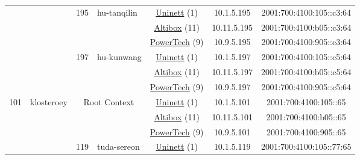 \begin{small}
\begin{center}
\begin{longtable}{|c|c|c|c|c|c|c|c|}
  &  & \multirow{3}{*}{\tiny{195}} & \multicolumn{1}{|l|}{\multirow{3}{*}{\tiny{hu-tanqilin}}} & \multicolumn{2}{|c|}{\tiny{\href{https://www.uninett.no}{Uninett} (1)}} & \tiny{10.1.5.195} & \tiny{2001:700:4100:105::c3:64} \\* \cline{5-5}\cline{6-6}\cline{7-7}\cline{8-8}
  &  &  &  & \multicolumn{2}{|c|}{\tiny{\href{https://www.altibox.no}{Altibox} (11)}} & \tiny{10.11.5.195} & \tiny{2001:700:4100:b05::c3:64} \\* \cline{5-5}\cline{6-6}\cline{7-7}\cline{8-8}
  &  &  &  & \multicolumn{2}{|c|}{\tiny{\href{http://www.powertech.no}{PowerTech} (9)}} & \tiny{10.9.5.195} & \tiny{2001:700:4100:905::c3:64} \\* \cline{3-3}\cline{4-4}\cline{5-5}\cline{6-6}\cline{7-7}\cline{8-8}
  &  & \multirow{3}{*}{\tiny{197}} & \multicolumn{1}{|l|}{\multirow{3}{*}{\tiny{hu-kunwang}}} & \multicolumn{2}{|c|}{\tiny{\href{https://www.uninett.no}{Uninett} (1)}} & \tiny{10.1.5.197} & \tiny{2001:700:4100:105::c5:64} \\* \cline{5-5}\cline{6-6}\cline{7-7}\cline{8-8}
  &  &  &  & \multicolumn{2}{|c|}{\tiny{\href{https://www.altibox.no}{Altibox} (11)}} & \tiny{10.11.5.197} & \tiny{2001:700:4100:b05::c5:64} \\* \cline{5-5}\cline{6-6}\cline{7-7}\cline{8-8}
  &  &  &  & \multicolumn{2}{|c|}{\tiny{\href{http://www.powertech.no}{PowerTech} (9)}} & \tiny{10.9.5.197} & \tiny{2001:700:4100:905::c5:64} \\ \hline
 \multirow{42}{*}{\tiny{101}} & \multicolumn{1}{|l|}{\multirow{42}{*}{\tiny{klosteroey}}} & \multicolumn{2}{|c|}{\multirow{3}{*}{\tiny{Root Context}}} & \multicolumn{2}{|c|}{\tiny{\href{https://www.uninett.no}{Uninett} (1)}} & \tiny{10.1.5.101} & \tiny{2001:700:4100:105::65} \\* \cline{5-5}\cline{6-6}\cline{7-7}\cline{8-8}
  &  & \multicolumn{2}{|c|}{} & \multicolumn{2}{|c|}{\tiny{\href{https://www.altibox.no}{Altibox} (11)}} & \tiny{10.11.5.101} & \tiny{2001:700:4100:b05::65} \\* \cline{5-5}\cline{6-6}\cline{7-7}\cline{8-8}
  &  & \multicolumn{2}{|c|}{} & \multicolumn{2}{|c|}{\tiny{\href{http://www.powertech.no}{PowerTech} (9)}} & \tiny{10.9.5.101} & \tiny{2001:700:4100:905::65} \\* \cline{3-3}\cline{4-4}\cline{5-5}\cline{6-6}\cline{7-7}\cline{8-8}
  &  & \multirow{3}{*}{\tiny{119}} & \multicolumn{1}{|l|}{\multirow{3}{*}{\tiny{tuda-sereon}}} & \multicolumn{2}{|c|}{\tiny{\href{https://www.uninett.no}{Uninett} (1)}} & \tiny{10.1.5.119} & \tiny{2001:700:4100:105::77:65} \\* \cline{5-5}\cline{6-6}\cline{7-7}\cline{8-8}

\end{longtable}
\end{center}
\end{small}
